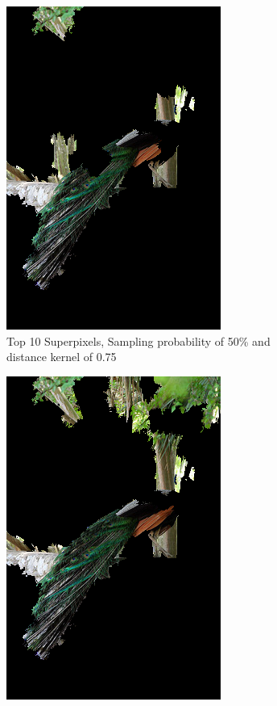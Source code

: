 \begin{figure}
\begin{subfigure}[t]{0.32\textwidth}
        \includegraphics[width=.7\linewidth]{figuras/lime/experiments/peacock/lime_peacock_sp0.5_dk0.75_nc10.png}
        \caption{Top 10 Superpixels, Sampling probability of 50\% and distance kernel of 0.75}
    \end{subfigure}
    \hfill
    \begin{subfigure}[t]{0.32\textwidth}
        \captionsetup{justification=centering}
        \centering
        \includegraphics[width=.7\linewidth]{figuras/lime/experiments/peacock/lime_peacock_sp0.8_dk0.75_nc15.png}

\end{subfigure}
\end{figure}
